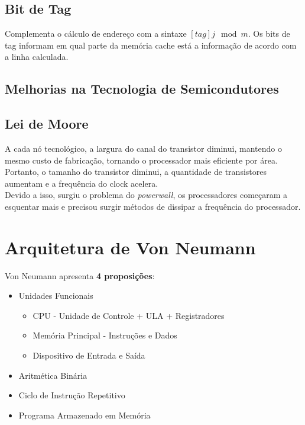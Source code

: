 \documentclass{article}
\begin{document}
		\subsection{Bit de Tag}
			Complementa o cálculo de endereço com a sintaxe $[tag]j \mod m$. Os bits de tag informam em qual parte da memória cache está a informação de acordo com a linha calculada.
		\subsection{Melhorias na Tecnologia de Semicondutores}
			\subsection{Lei de Moore}
				A cada nó tecnológico, a largura do canal do transistor diminui, mantendo o mesmo custo de fabricação, tornando o processador mais eficiente por área. Portanto, o tamanho do transistor diminui, a quantidade de transistores aumentam e a frequência do clock acelera.\\
				Devido a isso, surgiu o problema do \textit{powerwall}, os processadores começaram a esquentar mais e precisou surgir métodos de dissipar a frequência do processador.	
	\section{Arquitetura de Von Neumann}
		Von Neumann apresenta \textbf{4 proposições}:
		\begin{itemize}
			\item Unidades Funcionais
			\begin{itemize}
				\item CPU - Unidade de Controle + ULA + Registradores
				\item Memória Principal - Instruções e Dados
				\item Dispositivo de Entrada e Saída
			\end{itemize}
			\item Aritmética Binária
			\item Ciclo de Instrução Repetitivo
			\item Programa Armazenado em Memória			
		\end{itemize}
\end{document}
